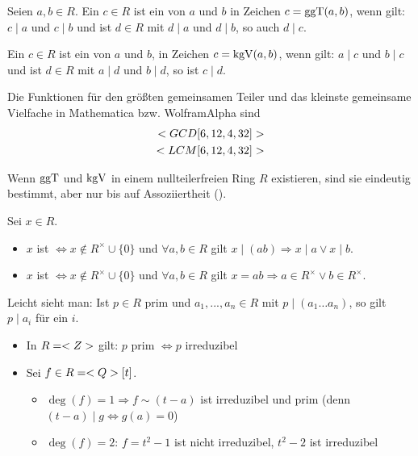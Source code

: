 \begin{definition}
	Seien $a,b\in R$. Ein $c\in R$ ist ein  von $a$ und $b$ in Zeichen $c=\ggT(a,b)$, wenn gilt: $c\mid a$ und $c\mid b$ und ist $d\in R$ mit $d\mid a$ und $d\mid b$, so auch $d\mid c$.
	
	Ein $c\in R$ ist ein  von $a$ und $b$, in Zeichen $c=\kgV(a,b)$, wenn gilt: $a\mid c$ und $b\mid c$ und ist $d\in R$ mit $a\mid d$ und $b\mid d$, so ist $c\mid d$.
\end{definition}

\begin{mathematica}
	Die Funktionen für den größten gemeinsamen Teiler und das kleinste gemeinsame Vielfache in Mathematica bzw. WolframAlpha sind
	\begin{align}
		\texttt{GCD[6,12,4,32]}\notag \\
		\texttt{LCM[6,12,4,32]}\notag
	\end{align}
\end{mathematica}

\begin{remark}
	Wenn $\ggT$ und $\kgV$ in einem nullteilerfreien Ring $R$ existieren, sind sie eindeutig bestimmt, aber nur bis auf Assoziiertheit ().
\end{remark}

\begin{definition}
	Sei $x\in R$. 
	\begin{itemize}
		\item $x$ ist  $\iff x\notin R^\times\cup \{0\}$ und $\forall a,b\in R$ gilt $x\mid (ab)\Rightarrow x\mid a\lor x\mid b$.
		\item $x$ ist  $\iff x\notin R^\times\cup \{0\}$ und $\forall a,b\in R$ gilt $x=ab\Rightarrow a\in R^\times \lor b\in R^\times$.
	\end{itemize}
\end{definition}

\begin{remark}
	Leicht sieht man: Ist $p\in R$ prim und $a_1,...,a_n\in R$ mit $p\mid (a_1\dots a_n)$, so gilt $p\mid a_i$ für ein $i$.
\end{remark}

\begin{example}
	\begin{itemize}
		\item In $R=\whole$ gilt: $p$ prim $\iff p$ irreduzibel
		\item Sei $f\in R=\ratio[t]$.
		\begin{itemize}
			\item $\deg(f)=1\Rightarrow f\sim (t-a)$ ist irreduzibel und prim (denn $(t-a)\mid g\iff g(a)=0$)
			\item $\deg(f)=2$: $f=t^2-1$ ist nicht irreduzibel, $t^2-2$ ist irreduzibel
		\end{itemize}
	\end{itemize}
\end{example}

